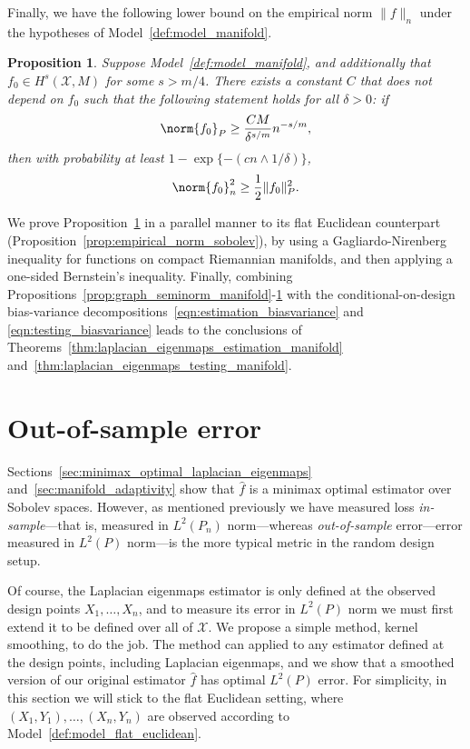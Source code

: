 \documentclass{article}
\newcommand{\1}{\mathbf{1}}
\newcommand{\Xset}{\mathcal{X}}
\newcommand{\Leb}{L}
\newcommand{\wh}[1]{\widehat{#1}}
\theoremstyle{alden}
\theoremstyle{aldenthm}
\newtheorem{proposition}{Proposition}
\theoremstyle{definition}
\theoremstyle{remark}
\begin{document}
Finally, we have the following lower bound on the empirical norm $\|f\|_n$ under the hypotheses of Model~\ref{def:model_manifold}. 
\begin{proposition}
	\label{prop:empirical_norm_sobolev_manifold}
	Suppose Model~\ref{def:model_manifold}, and additionally that $f_0 \in H^s(\Xset,M)$ for some $s > m/4$. There exists a constant $C$ that does not depend on $f_0$ such that the following statement holds for all $\delta > 0$:  if
	\begin{equation}
	\label{eqn:empirical_norm_sobolev_manifold_1}
	\norm{f_0}_{P} \geq \frac{C M}{\delta^{s/m}}n^{-s/m},
	\end{equation}
	then with probability at least $1 - \exp\{-(cn \wedge 1/\delta)\}$,
	\begin{equation}
	\label{eqn:empirical_norm_sobolev_manifold}
	\norm{f_0}_n^2 \geq \frac{1}{2} \|f_0\|_P^2.
	\end{equation}
\end{proposition}
We prove Proposition~\ref{prop:empirical_norm_sobolev_manifold} in a parallel manner to its flat Euclidean counterpart (Proposition~\ref{prop:empirical_norm_sobolev}), by using a Gagliardo-Nirenberg inequality for functions on compact Riemannian manifolds, and then applying a one-sided Bernstein's inequality. Finally, combining Propositions~\ref{prop:graph_seminorm_manifold}-\ref{prop:empirical_norm_sobolev_manifold} with the conditional-on-design bias-variance decompositions~\eqref{eqn:estimation_biasvariance} and \eqref{eqn:testing_biasvariance} leads to the conclusions of Theorems~\ref{thm:laplacian_eigenmaps_estimation_manifold} and~\ref{thm:laplacian_eigenmaps_testing_manifold}. 

\section{Out-of-sample error}
\label{sec:out_of_sample}
Sections~\ref{sec:minimax_optimal_laplacian_eigenmaps} and~\ref{sec:manifold_adaptivity} show that $\wh{f}$ is a minimax optimal estimator over Sobolev spaces. However, as mentioned previously we have measured loss \emph{in-sample}---that is, measured in $\Leb^2(P_n)$ norm---whereas \emph{out-of-sample} error---error measured in $L^2(P)$ norm---is the more typical metric in the random design setup.

Of course, the Laplacian eigenmaps estimator is only defined at the observed design points $X_1,\ldots,X_n$, and to measure its error in $L^2(P)$ norm we must first extend it to be defined over all of $\Xset$. We propose a simple method, kernel smoothing, to do the job. The method can applied to any estimator defined at the design points, including Laplacian eigenmaps, and we show that a smoothed version of our original estimator $\wh{f}$ has optimal $L^2(P)$ error. For simplicity, in this section we will stick to the flat Euclidean setting, where $(X_1,Y_1),\ldots,(X_n,Y_n)$ are observed according to Model~\ref{def:model_flat_euclidean}.
\end{document}
